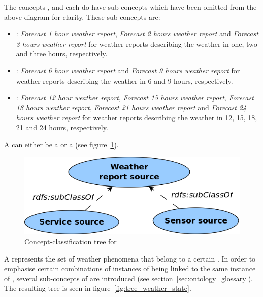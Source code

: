 The concepts ,  and  each do have sub-concepts which have been omitted from the above diagram for clarity. These sub-concepts are:
\begin{itemize}
  \item {}: \emph{Forecast 1 hour weather report}, \emph{Forecast 2 hours weather report} and \emph{Forecast 3 hours weather report} for weather reports describing the weather in one, two and three hours, respectively.
  \item {}: \emph{Forecast 6 hour weather report} and \emph{Forecast 9 hours weather report} for weather reports describing the weather in 6 and 9 hours, respectively.
  \item {}: \emph{Forecast 12 hour weather report}, \emph{Forecast 15 hours weather report}, \emph{Forecast 18 hours weather report}, \emph{Forecast 21 hours weather report} and \emph{Forecast 24 hours weather report} for weather reports describing the weather in 12, 15, 18, 21 and 24 hours, respectively.
\end{itemize}

A  can either be a  or a  (see figure~\ref{fig:tree_weather_source}).

\begin{figure}
  \centering
  \includegraphics[width=.5\textwidth]{figures/diagrams/weather-report-source.png}
  \caption{Concept-classification tree for }
  \label{fig:tree_weather_source}
\end{figure}

A  represents the set of weather phenomena that belong to a certain . In order to emphasise certain combinations of instances of  being linked to the same instance of , several sub-concepts of  are introduced (see section~\ref{sec:ontology_glossary}). The resulting tree is seen in figure~\ref{fig:tree_weather_state}.

